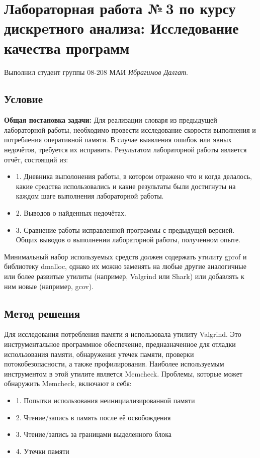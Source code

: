 \documentclass[12pt]{article}
\begin{document}
\section*{Лабораторная работа №\,3 по курсу дискрeтного анализа: Исследование качества программ}

\noindent Выполнил студент группы 08-208 МАИ \textit{Ибрагимов Далгат}.

\subsection*{Условие}
\textbf{Общая постановка задачи:} Для реализации словаря из предыдущей лабораторной работы, необходимо провести исследование скорости выполнения и потребления
оперативной памяти. В случае выявления ошибок или явных недочётов, требуется их
исправить. Результатом лабораторной работы является отчёт, состоящий из:
\begin{itemize}
\item 1. Дневника выполонения работы, в котором отражено что и когда делалось, какие
средства использовались и какие результаты были достигнуты на каждом шаге
выполнения лабораторной работы.
\item 2. Выводов о найденных недочётах.
\item 3. Сравнение работы исправленной программы с предыдущей версией. Общих выводов о выполнении лабораторной работы, полученном опыте.
\end{itemize}
Минимальный набор используемых средств должен содержать утилиту gprof и библиотеку dmalloc, однако их можно заменять на любые другие аналогичные или более развитые утилиты (например, Valgrind или Shark) или добавлять к ним новые (например,
gcov).


\subsection*{Метод решения}
Для исследования потребления памяти я использовала утилиту Valgrind. Это инструментальное программное обеспечение, предназначенное для отладки использования
памяти, обнаружения утечек памяти, проверки потокобезопасности, а также профилирования. Наиболее используемым инструментом в этой утилите является Memcheck.
Проблемы, которые может обнаружить Memcheck, включают в себя:

\begin{itemize} 
\item 1. Попытки использования неинициализированной памяти 
\item 2. Чтение/запись в память после её освобождения 
\item 3. Чтение/запись за границами выделенного блока 
\item 4. Утечки памяти
\end{itemize} 
\end{document}

